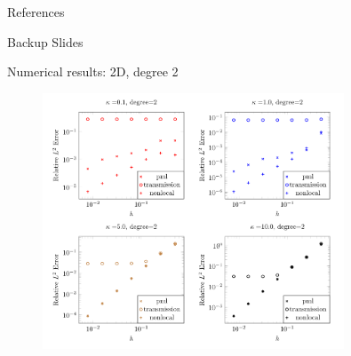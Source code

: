 \documentclass{beamer}
\begin{document}
\begin{frame}{References}
    \printbibliography
\end{frame}

\begin{frame}[noframenumbering]
    \begin{center}
        Backup Slides
    \end{center}
\end{frame}

\begin{frame}[noframenumbering]{Numerical results: 2D, degree 2}
    \begin{figure}[ht]
    \begin{center}
        \includegraphics[width=0.8\textwidth]{images/degree-2-accuracy.png}
    \end{center}
    \end{figure}
\end{frame}
\end{document}
